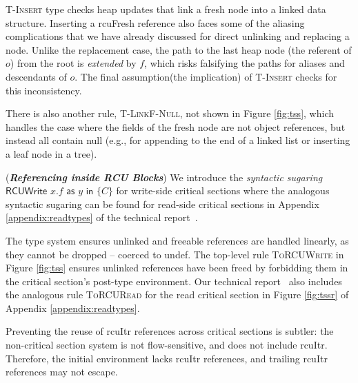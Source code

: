 
\textsc{T-Insert} type checks heap updates that link a fresh node into a linked data structure. Inserting a \textsf{rcuFresh} reference also faces some of the aliasing complications that we have already discussed for direct unlinking and replacing a node. Unlike the replacement case, the path to the last heap node (the referent of $o$) from the root is \emph{extended} by $f$, which risks falsifying the paths for aliases and descendants of $o$. The final assumption(the implication) of \textsc{T-Insert} checks for this inconsistency.

There is also another rule, \textsc{T-LinkF-Null}, not shown in Figure \ref{fig:tss}, which handles the case where the fields of the fresh node are not object references, but instead all contain null (e.g., for appending to the end of a linked list or inserting a leaf node in a tree).

(\textit{\textbf{Referencing inside \textsf{RCU} Blocks}})
We introduce the \textit{syntactic sugaring} $\textsf{RCUWrite } x.f \textsf{ as } y \textsf{ in } \{C\}$ for write-side critical sections where the analogous syntactic sugaring can be found for read-side critical sections in Appendix \ref{appendix:readtypes} of the technical report~\cite{isotek}.

The type system ensures \textsf{unlinked} and \textsf{freeable} references are handled linearly, as they cannot be dropped -- coerced to \textsf{undef}. The top-level rule \textsc{ToRCUWrite} in Figure \ref{fig:tss} ensures \textsf{unlinked} references have been freed by forbidding them in the critical section's post-type environment. Our technical report~\cite{isotek} also includes the analogous rule \textsc{ToRCURead} for the read critical section in Figure \ref{fig:tssr} of Appendix \ref{appendix:readtypes}.

Preventing the reuse of \textsf{rcuItr} references across critical sections is subtler: the non-critical section system is not flow-sensitive, and does not include \textsf{rcuItr}. Therefore, the initial environment lacks \textsf{rcuItr} references, and trailing \textsf{rcuItr} references may not escape.
